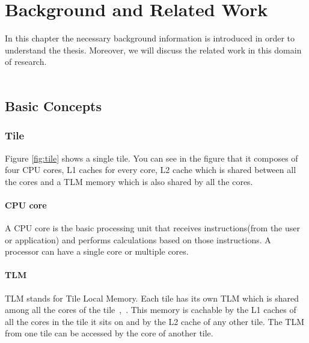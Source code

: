 \documentclass{listhesis}
\begin{document}
\chapter{Background and Related Work}
In this chapter the necessary background information is introduced in order to understand the thesis. Moreover, we will discuss the related work in this domain of research.\\
\\
\section{Basic Concepts}
\subsection{Tile}
Figure \ref{fig:tile} shows a single tile. You can see in the figure that it composes of four CPU cores, L1 caches for every core, L2 cache which is shared between all the cores and a TLM memory which is also shared by all the cores.
\subsubsection{CPU core}
A CPU core is the basic processing unit that receives instructions(from the user or application) and performs calculations based on those instructions. A processor can have a single core or multiple cores.  
\subsubsection{TLM}
TLM stands for Tile Local Memory. Each tile has its own TLM which is shared among all the cores of the tile~\cite{ankitThesis},~\cite{iNetworkAdapter}. This memory is cachable by the L1 caches of all the cores in the tile it sits on and by the L2 cache of any other tile. The TLM from one tile can be accessed by the core of another tile.\\
\end{document}
